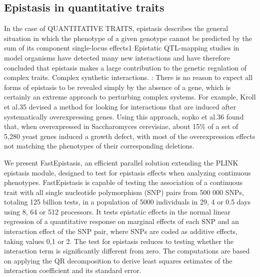 \subsection{Epistasis in quantitative traits}
 In the case of QUANTITATIVE TRAITS, epistasis describes the general situation in which the phenotype of a given genotype cannot be predicted by the sum of its component single-locus effects1 \cite{carlborg2004epistasis}
Epistatic QTL-mapping studies in model organisms have detected many new interactions and have therefore concluded that epistasis makes a large contribution to the genetic regulation of complex traits.  \cite{carlborg2004epistasis}
Complex synthetic interactions. : There is no reason to expect all forms of epistasis to be revealed simply by the absence of a gene, which is certainly an extreme approach to perturbing complex systems. For example, Kroll et al.35 devised a method for looking for interactions that are induced after systematically overexpressing genes. Using this approach, sopko et al.36 found that, when overexpressed in Saccharomyces cerevisiae, about 15\% of a set of 5,280 yeast genes induced a growth defect, with most of the overexpression effects not matching the phenotypes of their corresponding deletions.  \cite{phillips2008epistasis}

We present FastEpistasis, an efficient parallel solution extending the PLINK epistasis module, designed to test for epistasis effects when analyzing continuous phenotypes. \cite{schupbach2010fastepistasis}
FastEpistasis is capable of testing the association of a continuous trait with all single nucleotide polymorphism (SNP) pairs from 500 000 SNPs, totaling 125 billion tests, in a population of 5000 individuals in 29, 4 or 0.5 days using 8, 64 or 512 processors. \cite{schupbach2010fastepistasis}
It tests epistatic effects in the normal linear regression of a quantitative response on marginal effects of each SNP and an interaction effect of the SNP pair, where SNPs are coded as additive effects, taking values 0,1 or 2. The test for epistasis reduces to testing whether the interaction term is significantly different from zero. \cite{schupbach2010fastepistasis}
The computations are based on applying the QR decomposition to derive least squares estimates of the interaction coefficient and its standard error.  \cite{schupbach2010fastepistasis}


